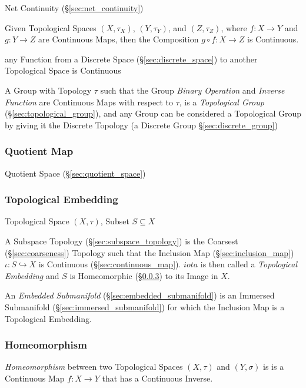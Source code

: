Net Continuity (\S\ref{sec:net_continuity})

Given Topological Spaces $(X, \tau_X)$, $(Y, \tau_Y)$, and $(Z,
\tau_Z)$, where $f: X \rightarrow Y$ and $g: Y \rightarrow Z$ are
Continuous Maps, then the Composition $g \circ f : X \rightarrow Z$ is
Continuous.

any Function from a Discrete Space (\S\ref{sec:discrete_space}) to another
Topological Space is Continuous

A Group with Topology $\tau$ such that the Group \emph{Binary Operation} and
\emph{Inverse Function} are Continuous Maps with respect to $\tau$, is a
\emph{Topological Group} (\S\ref{sec:topological_group}), and any Group can be
considered a Topological Group by giving it the Discrete Topology (a Discrete
Group \S\ref{sec:discrete_group})



\subsubsection{Quotient Map}\label{sec:quotient_map}

Quotient Space (\S\ref{sec:quotient_space})



\subsubsection{Topological Embedding}\label{sec:topological_embedding}

Topological Space $(X,\tau)$, Subset $S \subseteq X$

A Subspace Topology (\S\ref{sec:subspace_topology}) is the Coarsest
(\S\ref{sec:coarseness}) Topology such that the Inclusion Map
(\S\ref{sec:inclusion_map}) $\iota : S \hookrightarrow X$ is
Continuous (\S\ref{sec:continuous_map}). $iota$ is then called a
\emph{Topological Embedding} and $S$ is Homeomorphic
(\S\ref{sec:homeomorphism}) to its Image in $X$.

An \emph{Embedded Submanifold} (\S\ref{sec:embedded_submanifold}) is an
Immersed Submanifold (\S\ref{sec:immersed_submanifold}) for which the Inclusion
Map is a Topological Embedding.



\subsubsection{Homeomorphism}\label{sec:homeomorphism}

\emph{Homeomorphism} between two Topological Spaces $(X, \tau)$ and
$(Y, \sigma)$ is is a Continuous Map $f : X \rightarrow Y$ that has a
Continuous Inverse.

